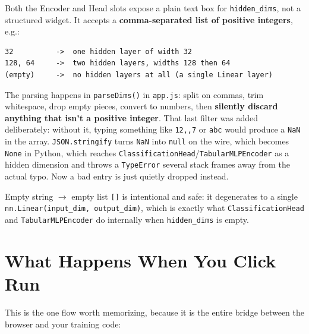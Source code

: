 \documentclass[11pt]{article}
\begin{document}
Both the Encoder and Head slots expose a plain text box for
\lstinline{hidden_dims}, not a structured widget. It accepts a
\textbf{comma-separated list of positive integers}, e.g.:

\begin{lstlisting}
32          ->  one hidden layer of width 32
128, 64     ->  two hidden layers, widths 128 then 64
(empty)     ->  no hidden layers at all (a single Linear layer)
\end{lstlisting}

The parsing happens in \lstinline{parseDims()} in \lstinline{app.js}: split
on commas, trim whitespace, drop empty pieces, convert to numbers, then
\textbf{silently discard anything that isn't a positive integer}. That last
filter was added deliberately: without it, typing something like
\lstinline{12,,7} or \lstinline{abc} would produce a \lstinline{NaN} in the
array. \lstinline{JSON.stringify} turns \lstinline{NaN} into \lstinline{null}
on the wire, which becomes \lstinline{None} in Python, which reaches
\lstinline{ClassificationHead}/\lstinline{TabularMLPEncoder} as a hidden
dimension and throws a \lstinline{TypeError} several stack frames away from
the actual typo. Now a bad entry is just quietly dropped instead.

Empty string $\to$ empty list \lstinline{[]} is intentional and safe: it
degenerates to a single \lstinline{nn.Linear(input_dim, output_dim)}, which
is exactly what \lstinline{ClassificationHead} and \lstinline{TabularMLPEncoder}
do internally when \lstinline{hidden_dims} is empty.

\section{What Happens When You Click Run}

This is the one flow worth memorizing, because it is the entire bridge
between the browser and your training code:
\end{document}
